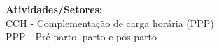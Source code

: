 {\fontsize{10pt}{12pt}\selectfont
\noindent
\textbf{Atividades/Setores:}\\
CCH - Complementação de carga horária (PPP)\\
PPP - Pré-parto, parto e pós-parto
}